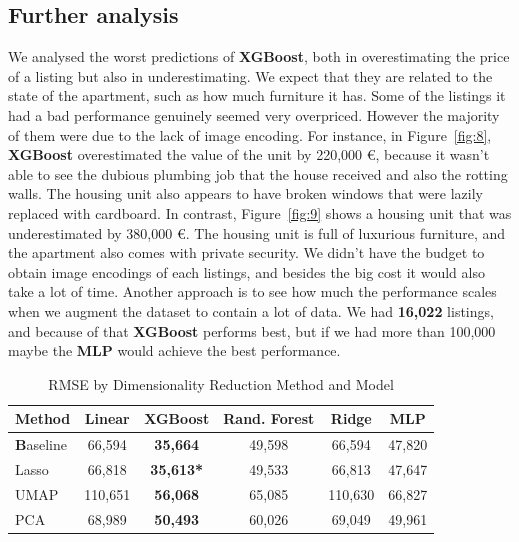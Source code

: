 \documentclass{article}
\begin{document}
\subsection{Further analysis}
We analysed the worst predictions of \textbf{XGBoost}, both in overestimating the price of a listing but also in underestimating. We expect that they are related to the state of the apartment, such as how much furniture it has. Some of the listings it had a bad performance genuinely seemed very overpriced. However the majority of them were due to the lack of image encoding. For instance, in Figure~\ref{fig:8}, \textbf{XGBoost} overestimated the value of the unit by 220{,}000 \euro \space, because it wasn't able to see the dubious plumbing job that the house received and also the rotting walls. The housing unit also appears to have broken windows that were lazily replaced with cardboard. In contrast, Figure~\ref{fig:9} shows a housing unit that was underestimated by 380{,}000 \euro. The housing unit is full of luxurious furniture, and the apartment also comes with private security. We didn't have the budget to obtain image encodings of each listings, and besides the big cost it would also take a lot of time. Another approach is to see how much the performance scales when we augment the dataset to contain a lot of data. We had \textbf{16{,}022} listings, and because of that \textbf{XGBoost} performs best, but if we had more than 100{,}000 maybe the \textbf{MLP} would achieve the best performance. 
\begin{table}[H]
\centering
\caption{RMSE by Dimensionality Reduction Method and Model}
\vspace{4pt}
\begin{tabular}{lccccc}
\toprule
\textbf{Method} & \textbf{Linear} & \textbf{XGBoost} & \textbf{Rand. Forest} & \textbf{Ridge} & \textbf{MLP}\\
\midrule

\textbf Baseline & 66{,}594 & \textbf{35{,}664} & 49{,}598 & 66{,}594 & 47,820 \\

Lasso  & 66{,}818  & \textbf{35{,}613*}  & 49{,}533  & 66{,}813 & 47{,}647  \\
UMAP   & 110{,}651 & \textbf{56{,}068}  & 65{,}085  & 110{,}630 & 66{,}827 \\
PCA    & 68{,}989  & \textbf{50{,}493}  & 60{,}026  & 69{,}049 & 49{,}961 \\
\bottomrule
\end{tabular}
\label{tab:2}
\end{table}
\end{document}
